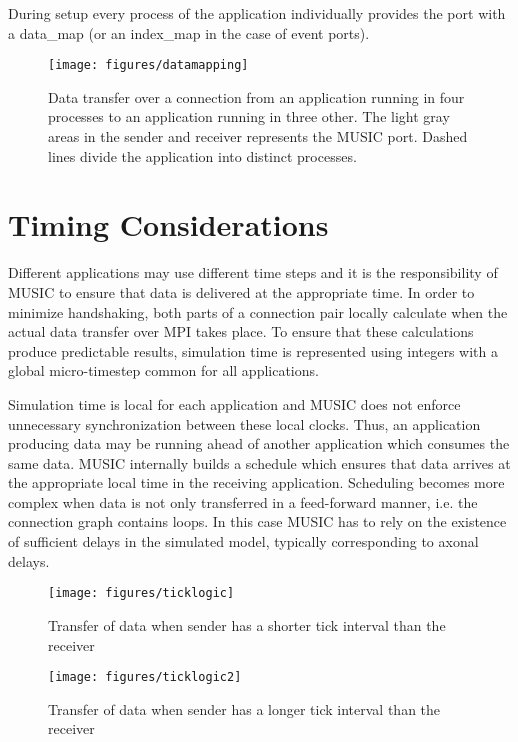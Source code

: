 \documentclass[a4paper]{report}
\begin{document}
During setup every process of the application individually provides
the port with a data_map (or an index_map in the case of event ports).

\begin{figure}
  \begin{center}
    \texttt{[image: figures/datamapping]}
    \caption[Mapping of data]{\label{fig:datamapping}
      Data transfer over a connection from an application running in
      four processes to an application running in three other.  The
      light gray areas in the sender and receiver represents the MUSIC
      port.  Dashed lines divide the application into distinct
      processes.
    }
  \end{center}
\end{figure}

\section{Timing Considerations}
\label{sec:timing}
  
Different applications may use different time steps and it is the
responsibility of MUSIC to ensure that data is delivered at the
appropriate time.  In order to minimize handshaking, both parts of a
connection pair locally calculate when the actual data transfer over
MPI takes place.  To ensure that these calculations produce
predictable results, simulation time is represented using integers
with a global micro-timestep common for all
applications.

Simulation time is local for each application
and MUSIC does not enforce unnecessary synchronization between these
local clocks.  Thus, an application producing data may be running
ahead of another application which consumes the same data.  MUSIC
internally builds a schedule which ensures that data arrives at the
appropriate local time in the receiving application.  Scheduling
becomes more complex when data is not only transferred in a
feed-forward manner, i.e. the connection graph contains loops.  In
this case MUSIC has to rely on the existence of sufficient delays in
the simulated model, typically corresponding to axonal
delays.

\begin{figure}
  \begin{center}
    \begin{minipage}{0.45\textwidth}
      \texttt{[image: figures/ticklogic]}
      \caption[Timing of data transfer, slowdown]{\label{fig:timingshorter}
        Transfer of data when sender has a shorter
        tick interval than the receiver}
    \end{minipage}
    \hfill
    \begin{minipage}{0.45\textwidth}
      \texttt{[image: figures/ticklogic2]}
      \caption[Timing of data transfer, speedup]{\label{fig:timinglonger}
        Transfer of data when sender has a longer
        tick interval than the receiver}
    \end{minipage}
  \end{center}
\end{figure}
\end{document}
